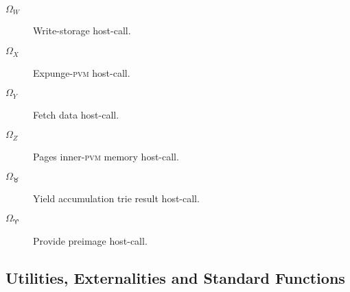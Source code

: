 \begin{description}
\begin{description}
    \item[$\Omega_W$] Write-storage host-call.
    \item[$\Omega_X$] Expunge-\textsc{pvm} host-call.
    \item[$\Omega_Y$] Fetch data host-call.
    \item[$\Omega_Z$] Pages inner-\textsc{pvm} memory host-call.
    \item[$\Omega_\Taurus$] Yield accumulation trie result host-call.
    \item[$\Omega_\Aries$] Provide preimage host-call.
  \end{description}
\end{description}

\subsection{Utilities, Externalities and Standard Functions}

